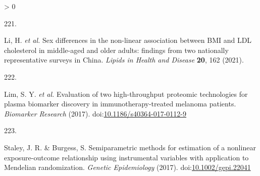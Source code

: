 \documentclass[11pt,twoside]{bristolthesis}
\newlength{\cslhangindent}
\newlength{\csllabelwidth}
\newenvironment{CSLReferences}[2] %
 {%
  \setlength{\parindent}{0pt}
  \ifodd #1 \everypar{\setlength{\hangindent}{\cslhangindent}}\ignorespaces\fi
  \ifnum #2 > 0
  \setlength{\parskip}{#2\baselineskip}
  \fi
 }%
 {}
\newcommand{\CSLLeftMargin}[1]{\parbox[t]{\csllabelwidth}{#1}}
\newcommand{\CSLRightInline}[1]{\parbox[t]{\linewidth - \csllabelwidth}{#1}\break}
\begin{document}
\begin{CSLReferences}{0}{0}
\leavevmode\hypertarget{ref-Li2021}{}%
\CSLLeftMargin{221. }
\CSLRightInline{Li, H. \emph{et al.} {Sex differences in the non-linear association between BMI and LDL cholesterol in middle-aged and older adults: findings from two nationally representative surveys in China}. \emph{Lipids in Health and Disease} \textbf{20}, 162 (2021).}

\leavevmode\hypertarget{ref-Lim2017}{}%
\CSLLeftMargin{222. }
\CSLRightInline{Lim, S. Y. \emph{et al.} {Evaluation of two high-throughput proteomic technologies for plasma biomarker discovery in immunotherapy-treated melanoma patients}. \emph{Biomarker Research} (2017). doi:\href{https://doi.org/10.1186/s40364-017-0112-9}{10.1186/s40364-017-0112-9}}

\leavevmode\hypertarget{ref-Staley2017}{}%
\CSLLeftMargin{223. }
\CSLRightInline{Staley, J. R. \& Burgess, S. {Semiparametric methods for estimation of a nonlinear exposure-outcome relationship using instrumental variables with application to Mendelian randomization}. \emph{Genetic Epidemiology} (2017). doi:\href{https://doi.org/10.1002/gepi.22041}{10.1002/gepi.22041}}

\end{CSLReferences}
\end{document}
